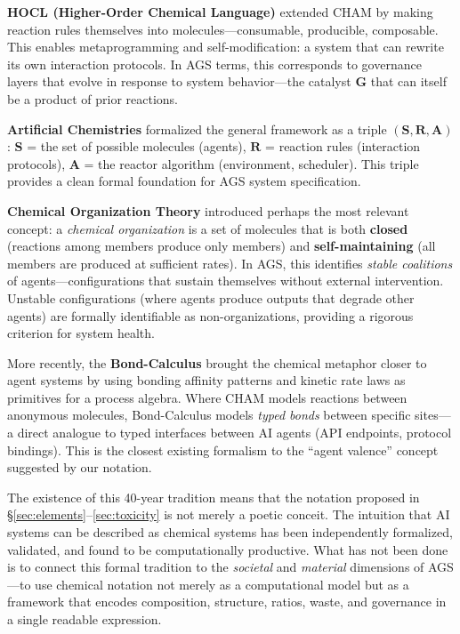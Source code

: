 \documentclass[12pt]{article}
\begin{document}
\textbf{HOCL (Higher-Order Chemical Language)} extended CHAM by making reaction rules themselves into molecules---consumable, producible, composable. This enables metaprogramming and self-modification: a system that can rewrite its own interaction protocols. In AGS terms, this corresponds to governance layers that evolve in response to system behavior---the catalyst \textbf{G} that can itself be a product of prior reactions.

\textbf{Artificial Chemistries} \citep{dittrich2001} formalized the general framework as a triple $(\mathbf{S}, \mathbf{R}, \mathbf{A})$: $\mathbf{S}$ = the set of possible molecules (agents), $\mathbf{R}$ = reaction rules (interaction protocols), $\mathbf{A}$ = the reactor algorithm (environment, scheduler). This triple provides a clean formal foundation for AGS system specification.

\textbf{Chemical Organization Theory} \citep{dittrich2007} introduced perhaps the most relevant concept: a \emph{chemical organization} is a set of molecules that is both \textbf{closed} (reactions among members produce only members) and \textbf{self-maintaining} (all members are produced at sufficient rates). In AGS, this identifies \emph{stable coalitions} of agents---configurations that sustain themselves without external intervention. Unstable configurations (where agents produce outputs that degrade other agents) are formally identifiable as non-organizations, providing a rigorous criterion for system health.

More recently, the \textbf{Bond-Calculus} \citep{wright2018} brought the chemical metaphor closer to agent systems by using bonding affinity patterns and kinetic rate laws as primitives for a process algebra. Where CHAM models reactions between anonymous molecules, Bond-Calculus models \emph{typed bonds} between specific sites---a direct analogue to typed interfaces between AI agents (API endpoints, protocol bindings). This is the closest existing formalism to the ``agent valence'' concept suggested by our notation.

The existence of this 40-year tradition means that the notation proposed in \S\ref{sec:elements}--\ref{sec:toxicity} is not merely a poetic conceit. The intuition that AI systems can be described as chemical systems has been independently formalized, validated, and found to be computationally productive. What has not been done is to connect this formal tradition to the \emph{societal} and \emph{material} dimensions of AGS---to use chemical notation not merely as a computational model but as a framework that encodes composition, structure, ratios, waste, and governance in a single readable expression.
\end{document}
